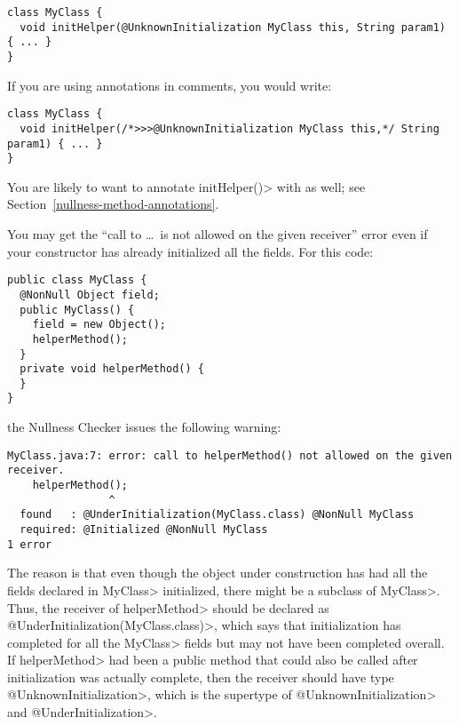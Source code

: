 \begin{Verbatim}
class MyClass {
  void initHelper(@UnknownInitialization MyClass this, String param1) { ... }
}
\end{Verbatim}

\noindent
If you are using annotations in comments, you would write:

\begin{Verbatim}
class MyClass {
  void initHelper(/*>>>@UnknownInitialization MyClass this,*/ String param1) { ... }
}
\end{Verbatim}

\noindent
You are likely to want to annotate \<initHelper()> with
 as well; see
Section~\ref{nullness-method-annotations}.


You may get the ``call to \ldots\ is not allowed on the given receiver''
error even if your constructor has already initialized all the fields.
For this code:

\begin{Verbatim}
public class MyClass {
  @NonNull Object field;
  public MyClass() {
    field = new Object();
    helperMethod();
  }
  private void helperMethod() {
  }
}
\end{Verbatim}

\noindent
the Nullness Checker issues the following warning:

\begin{Verbatim}
MyClass.java:7: error: call to helperMethod() not allowed on the given receiver.
    helperMethod();
                ^
  found   : @UnderInitialization(MyClass.class) @NonNull MyClass
  required: @Initialized @NonNull MyClass
1 error
\end{Verbatim}

\begin{sloppypar}
The reason is that even though the object under construction has had all
the fields declared in \<MyClass> initialized, there might be a subclass of
\<MyClass>.  Thus, the receiver of \<helperMethod> should be declared as
\<@UnderInitialization(MyClass.class)>, which says that initialization has
completed for all the \<MyClass> fields but may not have been completed
overall.  If \<helperMethod> had been a public method that could also be called after
initialization was actually complete, then the receiver should have type
\<@UnknownInitialization>, which is the supertype of
\<@UnknownInitialization> and \<@UnderInitialization>.
\end{sloppypar}


